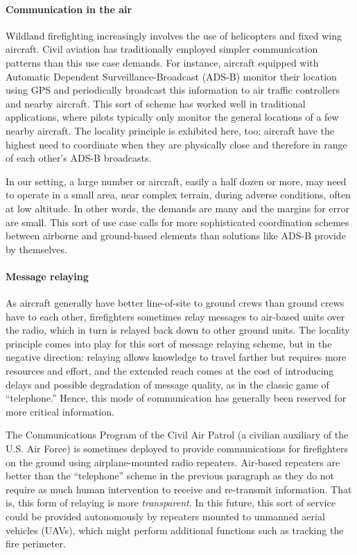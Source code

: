 \documentclass[]             %
{NASA}                       %
\theoremstyle{definition}
\begin{document}
\paragraph{Communication in the air}
Wildland firefighting increasingly involves the use of helicopters and
fixed wing aircraft. Civil aviation has traditionally employed simpler
communication patterns than this use case demands. For instance,
aircraft equipped with Automatic Dependent Surveillance-Broadcast
(ADS-B) monitor their location using GPS and periodically broadcast
this information to air traffic controllers and nearby aircraft. This
sort of scheme has worked well in traditional applications, where
pilots typically only monitor the general locations of a few nearby
aircraft. The locality principle is exhibited here, too: aircraft have
the highest need to coordinate when they are physically close and
therefore in range of each other's ADS-B broadcasts.

In our setting, a large number or aircraft, easily a half dozen or
more, may need to operate in a small area, near complex terrain,
during adverse conditions, often at low altitude. In other words, the
demands are many and the margins for error are small. This sort of use
case calls for more sophisticated coordination schemes between
airborne and ground-based elements than solutions like ADS-B provide
by themselves.

\paragraph{Message relaying}
As aircraft generally have better line-of-site to ground crews than
ground crews have to each other, firefighters sometimes relay messages
to air-based units over the radio, which in turn is relayed back down
to other ground units. The locality principle comes into play for this
sort of message relaying scheme, but in the negative direction:
relaying allows knowledge to travel farther but requires more resources and effort,
and the extended reach comes at the cost of introducing delays and
possible degradation of message quality, as in the classic game of
``telephone.'' Hence, this mode of communication has generally been reserved for
more critical information.

The Communications Program of the Civil Air Patrol (a civilian
auxiliary of the U.S. Air Force) is sometimes deployed to provide
communications for firefighters on the ground using airplane-mounted
radio repeaters. Air-based repeaters are better than the ``telephone''
scheme in the previous paragraph as they do not require as much human
intervention to receive and re-transmit information. That is, this
form of relaying is more \emph{transparent}. In this future, this sort
of service could be provided autonomously by repeaters mounted to
unmanned aerial vehicles (UAVs), which might perform additional
functions such as tracking the fire perimeter.
\end{document}
